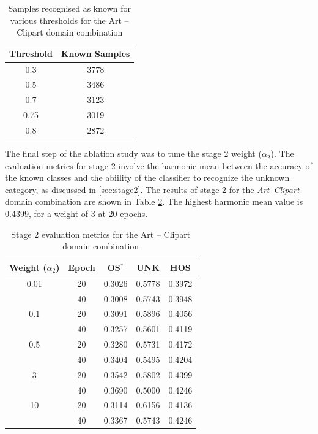 \documentclass[10pt,twocolumn,letterpaper]{article}
\begin{document}
\begin{table}[!htb]
  \centering
  \begin{tabular}{@{}|cc|@{}}
    \hline
 \textbf{Threshold} & \textbf{Known Samples} \\
    \hline 
 0.3 & 3778 \\
 0.5 & 3486 \\
 0.7 & 3123 \\
 0.75 & 3019 \\
 0.8 & 2872 \\
    \hline
  \end{tabular}
  \caption{Samples recognised as known for various thresholds for the Art -- Clipart domain combination}
  \label{tab:threshold}
\end{table}

The final step of the ablation study was to tune the stage 2 weight ($\alpha_2$). The evaluation metrics for stage 2 involve the harmonic mean between the accuracy of the known classes and the abiility of the classifier to recognize the unknown category, as discussed in \ref{sec:stage2}. The results of stage 2 for the \textit{Art}--\textit{Clipart} domain combination are shown in Table \ref{tab:tuneHOS}. The highest harmonic mean value is 0.4399, for a weight of 3 at 20 epochs.

\begin{table}[!htb]
  \centering
  \begin{tabular}{@{}|ccccc|@{}}
    \hline
 \textbf{Weight ($\alpha_2$}) & \textbf{Epoch} & \textbf{OS$^*$} & \textbf{UNK} & \textbf{HOS} \\
    \hline 
 0.01 & 20 & 0.3026 & 0.5778 & 0.3972 \\
 & 40 & 0.3008 & 0.5743 & 0.3948 \\ \hline
0.1 & 20 & 0.3091 & 0.5896 & 0.4056 \\
 & 40 & 0.3257 & 0.5601 & 0.4119 \\\hline
0.5 & 20 & 0.3280 & 0.5731 & 0.4172 \\
 & 40 & 0.3404 & 0.5495 & 0.4204 \\\hline
3 & 20 & 0.3542 & 0.5802 & 0.4399 \\
 & 40 & 0.3690 & 0.5000 & 0.4246 \\\hline
10 & 20 & 0.3114 & 0.6156 & 0.4136 \\
 & 40 & 0.3367 & 0.5743 & 0.4246 \\
    \hline
  \end{tabular}
  \caption{Stage 2 evaluation metrics for the Art -- Clipart domain combination}
  \label{tab:tuneHOS}
\end{table}
\end{document}
